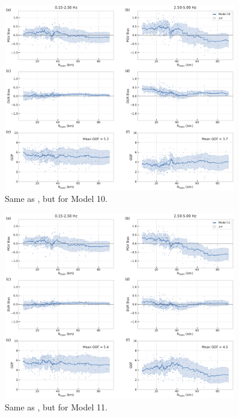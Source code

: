 \begin{figure}[!ht]
  \centering
  \includegraphics[width=0.9\textwidth,height=0.9\textheight,keepaspectratio]{figures/figure_highf_S20.pdf}
  \caption{Same as , but for Model 10.
  }
\label{fig:highf-S20}
\end{figure}
\clearpage


\begin{figure}[!ht]
  \centering
  \includegraphics[width=0.9\textwidth,height=0.9\textheight,keepaspectratio]{figures/figure_highf_S21.pdf}
  \caption{Same as , but for Model 11.
  }
\label{fig:highf-S21}
\end{figure}
\clearpage


